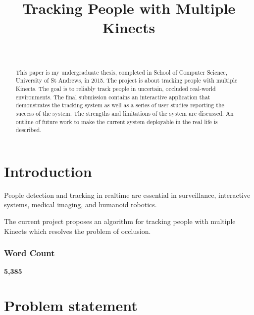 \documentclass{sigchi}
\begin{document}
\title{Tracking People with Multiple Kinects}

\author{%
  \\
}

\maketitle

\begin{abstract}
This paper is my undergraduate thesis, completed in School of Computer Science, University of St Andrews, in 2015. The project is about tracking people with multiple Kinects. The goal is to reliably track people in uncertain, occluded real-world environments. The final submission contains an interactive application that demonstrates the tracking system as well as a series of user studies reporting the success of the system. The strengths and limitations of the system are discussed. An outline of future work to make the current system deployable in the real life is described.

\end{abstract}



\section{Introduction}
\label{sec:introduction}

People detection and tracking in realtime are essential in surveillance, interactive systems, medical imaging, and humanoid robotics.

The current project proposes an algorithm for tracking people with multiple Kinects which resolves the problem of occlusion.

\subsubsection{Word Count}

\textbf{5,385}

\section{Problem statement}
\label{sec:problem_statement}
\end{document}
